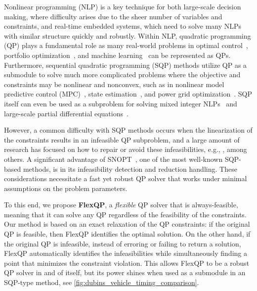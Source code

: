 \documentclass{article} %
\begin{document}
Nonlinear programming (NLP) is a key technique for both large-scale decision making, where difficulty arises due to the sheer number of variables and constraints, and real-time embedded systems, which need to solve many NLPs with similar structure quickly and robustly.
Within NLP, quadratic programming (QP) plays a fundamental role as many real-world problems in optimal control~\citep{anderson2007optimal}, portfolio optimization~\citep{markowitz1952portfolio,boyd2013performance,boyd2017multi}, and machine learning~\citep{huber1964robust,cortes1995support,tibshirani1996regression,candes2008enhancing} can be represented as QPs.
Furthermore, sequential quadratic programming (SQP) methods utilize QP as a submodule to solve much more complicated problems where the objective and constraints may be nonlinear and nonconvex, such as in nonlinear model predictive control (MPC)~\citep{diehl2009efficient,rawlings2020model}, state estimation~\citep{aravkin2017generalized}, and power grid optimization~\citep{montoya2019sequential}.
SQP itself can even be used as a subproblem for solving mixed integer NLPs~\citep{leyffer2001integrating} and large-scale partial differential equations~\citep{fang2023sqp}.

However, a common difficulty with SQP methods occurs when the linearization of the constraints results in an infeasible QP subproblem, and a large amount of research has focused on how to repair or avoid these infeasibilities, e.g., \citep{fletcher1985l1,izmailov2012stabilized}, among others.
A significant advantage of SNOPT~\citep{gill2005snopt}, one of the most well-known SQP-based methods, is in its infeasibility detection and reduction handling.
These considerations necessitate a fast yet robust QP solver that works under minimal assumptions on the problem parameters.

To this end, we propose \textbf{FlexQP}, a \textit{flexible} QP solver that is always-feasible, meaning that it can solve any QP regardless of the feasibility of the constraints.
Our method is based on an exact relaxation of the QP constraints: if the original QP is feasible, then FlexQP identifies the optimal solution.
On the other hand, if the original QP is infeasible, instead of erroring or failing to return a solution, FlexQP automatically identifies the infeasibilities while simultaneously finding a point that minimizes the constraint violation.
This allows FlexQP to be a robust QP solver in and of itself, but its power shines when used as a submodule in an SQP-type method, see \cref{fig:dubins_vehicle_timing_comparison}.
\end{document}
